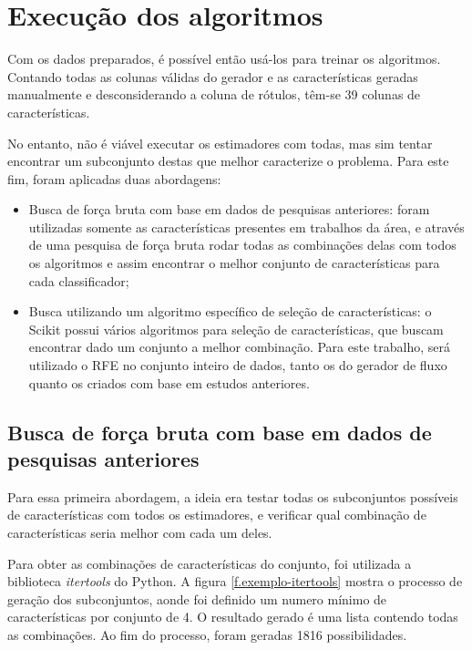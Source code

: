 \section{Execução dos algoritmos}

Com os dados preparados, é possível então usá-los para treinar os algoritmos. Contando todas as colunas válidas do gerador e as características geradas manualmente e desconsiderando a coluna de rótulos, têm-se 39 colunas de características.

No entanto, não é viável executar os estimadores com todas, mas sim tentar encontrar um subconjunto destas que melhor caracterize o problema. Para este fim, foram aplicadas duas abordagens:

\begin{itemize}
    \item Busca de força bruta com base em dados de pesquisas anteriores: foram utilizadas somente as características presentes em trabalhos da área, e através de uma pesquisa de força bruta rodar todas as combinações delas com todos os algoritmos e assim encontrar o melhor conjunto de características para cada classificador;

    \item Busca utilizando um algoritmo específico de seleção de características: o Scikit possui vários algoritmos para seleção de características, que buscam encontrar dado um conjunto a melhor combinação. Para este trabalho, será utilizado o RFE no conjunto inteiro de dados, tanto os do gerador de fluxo quanto os criados com base em estudos anteriores. 
\end{itemize}

\subsection{Busca de força bruta com base em dados de pesquisas anteriores}
\label{ss.dados-hist}

Para essa primeira abordagem, a ideia era testar todas os subconjuntos possíveis de características com todos os estimadores, e verificar qual combinação de características seria melhor com cada um deles.

Para obter as combinações de características do conjunto, foi utilizada a biblioteca \textit{itertools} do Python. A figura \ref{f.exemplo-itertools} mostra o processo de geração dos subconjuntos, aonde foi definido um numero mínimo de características por conjunto de 4. O resultado gerado é uma lista contendo todas as combinações. Ao fim do processo, foram geradas 1816 possibilidades.

